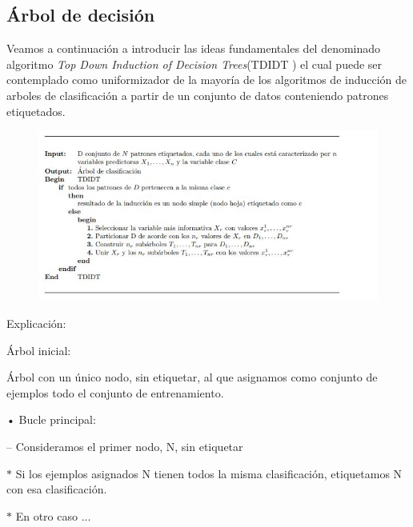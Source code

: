 \documentclass[10pt]{article}
\begin{document}
\subsection{Árbol de decisión}

Veamos a continuación a introducir las ideas fundamentales del denominado algoritmo \textit{Top Down Induction of Decision Trees}(TDIDT ) el cual puede ser contemplado como uniformizador de la mayoría de los algoritmos de inducción de arboles de clasificación a partir de un conjunto de datos conteniendo patrones etiquetados. \cite{IEEEreferencias:Ref2}
\begin{figure}[H]
	\begin{center}
\includegraphics[scale = 0.85]{Imagenes/algoritmo.JPG}
	\end{center} 
\end{figure}

\setlength{\parskip}{2mm}

Explicación:

Árbol inicial:

Árbol con un único nodo, sin etiquetar, al que asignamos como conjunto de ejemplos todo el conjunto de entrenamiento.

\setlength{\parskip}{2mm}

• Bucle principal:

\setlength{\parskip}{2mm}

– Consideramos el primer nodo, N, sin etiquetar
\setlength{\parskip}{2mm}

$\ast$ Si los ejemplos asignados N tienen todos la misma clasificación,  etiquetamos N con esa clasificación.

\setlength{\parskip}{2mm}

$\ast$ En otro caso ...

\setlength{\parskip}{2mm}
\end{document}
